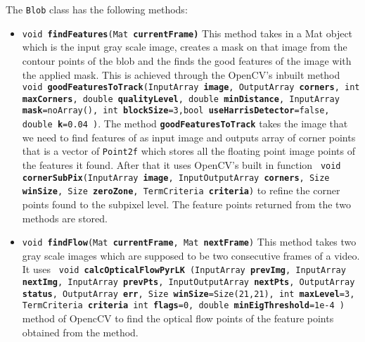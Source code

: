 \documentclass[a4paper]{aitthesis}
\begin{document}
 The \texttt{Blob} class has the following methods:
 
 \begin{itemize}
 \item \texttt{void \textbf{findFeatures}(Mat \textbf{currentFrame)}} \newline
 This method takes in a Mat object which is the input gray scale image, creates a mask on that image from the contour points of the blob and the finds the good features of the image with the applied mask. This is achieved through the OpenCV's inbuilt method \texttt{ void \textbf{goodFeaturesToTrack}(InputArray \textbf{image}, OutputArray \textbf{corners}, \newline int \textbf{maxCorners}, double \textbf{qualityLevel}, double \textbf{minDistance}, \newline InputArray \textbf{mask}=noArray(), int \textbf{blockSize}=3,\newline bool \textbf{useHarrisDetector}=false, double \textbf{k}=0.04 )}. The method \newline \texttt{\textbf{goodFeaturesToTrack}} takes the image that we need to find features of as input image and outputs array of corner points that is a vector of \texttt{Point2f} which stores all the floating point image points of the features it found. After that it uses OpenCV's built in function \texttt{ void \textbf{cornerSubPix}(InputArray \textbf{image}, InputOutputArray \textbf{corners}, \newline Size \textbf{winSize}, Size \textbf{zeroZone}, TermCriteria \textbf{criteria})} to refine the corner points found to the subpixel level. The feature points returned from the two methods are stored.
 
 \item \texttt{void \textbf{findFlow}(Mat \textbf{currentFrame}, Mat \textbf{nextFrame})} \newline
 This method takes two gray scale images which are supposed to be two consecutive frames of a video. It uses \texttt{ void \textbf{calcOpticalFlowPyrLK} \newline (InputArray \textbf{prevImg}, InputArray \textbf{nextImg}, InputArray \textbf{prevPts}, \newline InputOutputArray \textbf{nextPts}, OutputArray \textbf{status}, OutputArray \textbf{err}, \newline Size \textbf{winSize}=Size(21,21), int \textbf{maxLevel}=3, TermCriteria \textbf{criteria} int \textbf{flags}=0, double \textbf{minEigThreshold}=1e-4 )} method of OpencCV to find the optical flow points of the feature points obtained from the  method.


\end{itemize}
\end{document}
